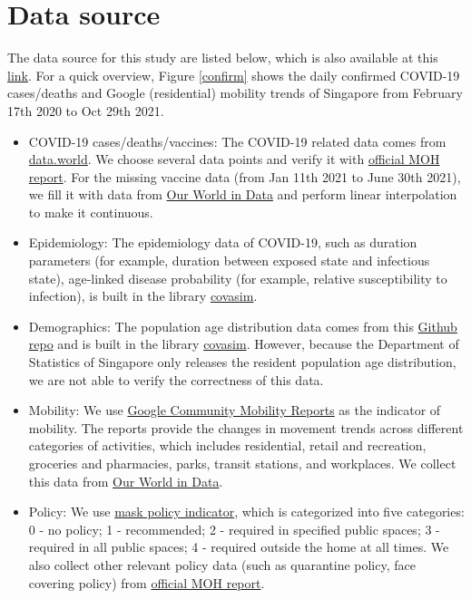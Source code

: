 \section{Data source}
The data source for this study are listed below, which is also available at this \href{https://drive.google.com/drive/folders/1nVRsTTLyp0k4gV46zZ6d8C2gQEJnXjfd?usp=sharing}{link}. For a quick overview, Figure \ref{confirm} shows the daily confirmed COVID-19 cases/deaths and Google (residential) mobility trends of Singapore from February 17th 2020 to Oct 29th 2021.
\begin{itemize}
	\item COVID-19 cases/deaths/vaccines: The COVID-19 related data comes from \href{https://data.world/hxchua/covid-19-singapore}{data.world}. We choose several data points and verify it with \href{https://www.moh.gov.sg/covid-19/past-updates}{official MOH report}. For the missing vaccine data (from Jan 11th 2021 to June 30th 2021), we fill it with data from \href{https://ourworldindata.org/covid-vaccinations?country=SGP}{Our World in Data} and perform linear interpolation to make it continuous.
	\item Epidemiology: The epidemiology data of COVID-19, such as duration parameters (for example, duration between exposed state and infectious state), age-linked disease probability (for example, relative susceptibility to infection), is built in the library \href{https://github.com/InstituteforDiseaseModeling/covasim}{covasim}. 
	\item Demographics: The population age distribution data comes from this \href{https://github.com/neherlab/covid19_scenarios/blob/master/src/assets/data/ageDistribution.json}{Github repo} and is built in the library \href{https://github.com/InstituteforDiseaseModeling/covasim}{covasim}. However, because the Department of Statistics of Singapore only releases the resident population age distribution, we are not able to verify the correctness of this data.
	\item Mobility: We use \href{https://www.google.com/covid19/mobility/}{Google Community Mobility Reports} as the indicator of mobility. The reports provide the changes in movement trends across different categories of activities, which includes residential, retail and recreation, groceries and pharmacies, parks, transit stations, and workplaces. We collect this data from \href{https://ourworldindata.org/covid-google-mobility-trends}{Our World in Data}.
	\item Policy: We use \href{https://github.com/OxCGRT/covid-policy-tracker/tree/master/data}{mask policy indicator}, which is categorized into five categories: 0 - no policy; 1 - recommended; 2 - required in specified public spaces; 3 - required in all public spaces; 4 - required outside the home at all times. We also collect other relevant policy data (such as quarantine policy, face covering policy) from \href{https://www.moh.gov.sg/covid-19/past-updates}{official MOH report}.
\end{itemize}
